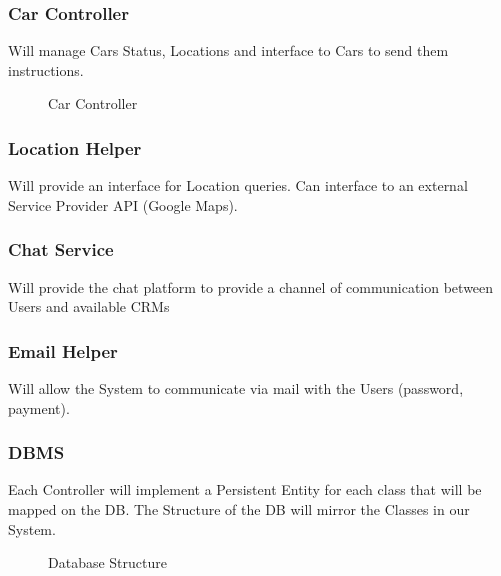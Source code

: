 \documentclass[a4paper]{article}
\begin{document}
\subsubsection{Car Controller}
Will manage Cars Status, Locations and interface to Cars to send them instructions.
\begin{figure}[h]
\centering
\vspace*{\fill}
\noindent{}%
\caption {Car Controller}
\vspace*{0.5cm}
\end{figure}
\subsubsection{Location Helper}
Will provide an interface for Location queries. Can interface to an external Service Provider API (Google Maps).
\subsubsection{Chat Service}
 Will provide the chat platform to provide a channel of communication between Users and available CRMs
\subsubsection{Email Helper}
Will allow the System to communicate via mail with the Users (password, payment).
\newpage
\subsubsection{DBMS} 
Each Controller will implement a Persistent Entity for each class that will be mapped on the DB.
The Structure of the DB will mirror the Classes in our System.
\begin{figure}[h]
\centering
\vspace*{\fill}
\noindent{}%
\caption {Database Structure}
\vspace*{0.5cm}
\end{figure}

\newpage
\end{document}
